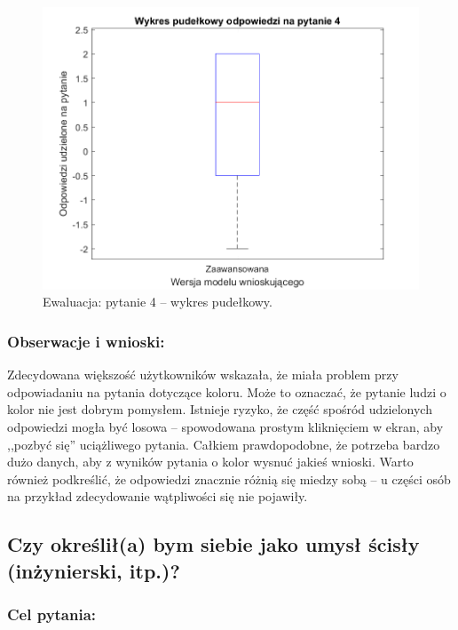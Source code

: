 	\begin{figure}[H]
		\centering
		\includegraphics[scale=0.8]{rozdzial5/Ewaluacja4.png}
		\caption{Ewaluacja: pytanie 4 -- wykres pudełkowy.}
	\end{figure}
	
	\subsubsection{Obserwacje i wnioski:}
	
	Zdecydowana większość użytkowników wskazała, że miała problem przy odpowiadaniu na pytania dotyczące koloru. Może to oznaczać, że pytanie ludzi o kolor nie jest dobrym pomysłem. Istnieje ryzyko, że część spośród udzielonych odpowiedzi mogła być losowa -- spowodowana prostym kliknięciem w ekran, aby ,,pozbyć się'' uciążliwego pytania. Całkiem prawdopodobne, że potrzeba bardzo dużo danych, aby z wyników pytania o kolor wysnuć jakieś wnioski. Warto również podkreślić, że odpowiedzi znacznie różnią się miedzy sobą -- u części osób na przykład zdecydowanie wątpliwości się nie pojawiły.



\subsection{Czy określił(a) bym siebie jako umysł ścisły (inżynierski, itp.)?}

	\subsubsection{Cel pytania:}
	
